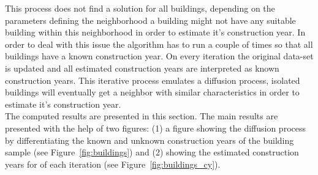 %

%

This process does not find a solution for all buildings, depending on the
parameters defining the neighborhood a building might not have any suitable
building within this neighborhood in order to estimate it's construction year.
In order to deal with this issue the algorithm has to run a couple of times so
that all buildings have a known construction year. On every iteration the
original data-set is updated and all estimated construction years are
interpreted as known construction years. This iterative process emulates a
diffusion process, isolated buildings will eventually get a neighbor with
similar characteristics in order to estimate it's construction year.\\

The computed results are presented in this section. The main results are
presented with the help of two figures: (1) a figure showing the diffusion
process by differentiating the known and unknown construction years of the
building sample (see Figure~\ref{fig:buildings}) and (2) showing the estimated
construction years for of each iteration (see Figure~\ref{fig:buildings_cy}).\\

